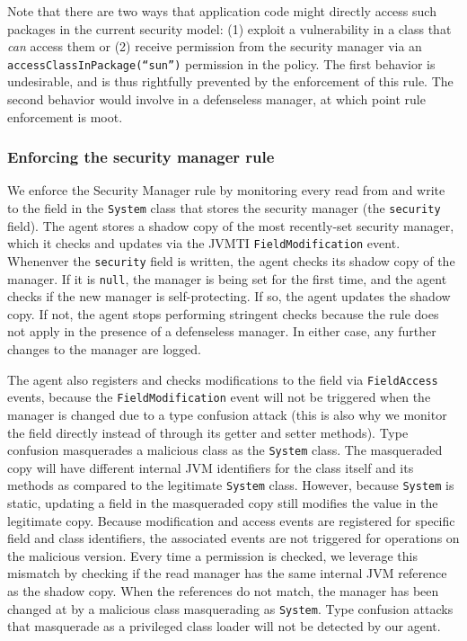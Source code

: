 \documentclass{sig-alternate}
\newcommand{\clg}[1]{\todo[color=yellow]{CLG: #1}}
\begin{document}
Note that there are two ways that application code might directly access such
packages in the current security model: 
(1) exploit a vulnerability in a class that \emph{can} access them or (2)
receive permission from the security manager via an
\texttt{accessClassInPackage(``sun'')} permission in the policy.  The first behavior
is undesirable, and is thus rightfully prevented by the enforcement of this
rule.  The second behavior would involve in a defenseless manager, at which
point rule enforcement is moot.


\subsubsection{Enforcing the security manager rule}\label{sub:Enforcing-the-SecurityManager}

We enforce the Security Manager rule by monitoring every read from
and write to the field in the \texttt{System} class that stores the security
manager (the \texttt{security} field).
%
The agent stores a shadow copy of the most recently-set security
manager, which it checks and updates via the JVMTI \texttt{FieldModification} event.
Whenenver the \texttt{security} field is written, the agent checks its
shadow copy of the manager.  If it is \texttt{null},
the manager is being set for the first time, and the agent checks
if the new manager is self-protecting. If so, 
the agent updates the shadow copy. If not, the agent stops performing stringent
checks because the rule does not apply in the presence of a defenseless 
manager. In either case, any further changes to the manager are logged.

The agent also registers and checks modifications to the field via
\texttt{FieldAccess} events, 
because the \texttt{FieldModification} event will not be triggered
when the manager is changed due to a type confusion attack (this is also why we
monitor the field directly instead of through its getter and setter methods).  Type confusion 
masquerades a malicious class as the
\texttt{System} class.  The masqueraded copy will have different internal
JVM identifiers for the class itself and its methods as compared to the legitimate
\texttt{System} class. However, because \texttt{System} is static, updating a
field in the masqueraded copy still modifies the value in the legitimate copy. 
Because 
modification and access events are registered for specific field and
class identifiers, the associated events are not triggered for operations
on the malicious version. Every time a permission is checked, we leverage this mismatch
by checking if the read manager has the same internal
JVM reference as the shadow copy. When the references do not match,
the manager has been changed at by a malicious class masquerading as
\texttt{System}. Type confusion attacks that masquerade
as a privileged class loader will not be detected by our agent.\clg{is this a problem?}
\end{document}
